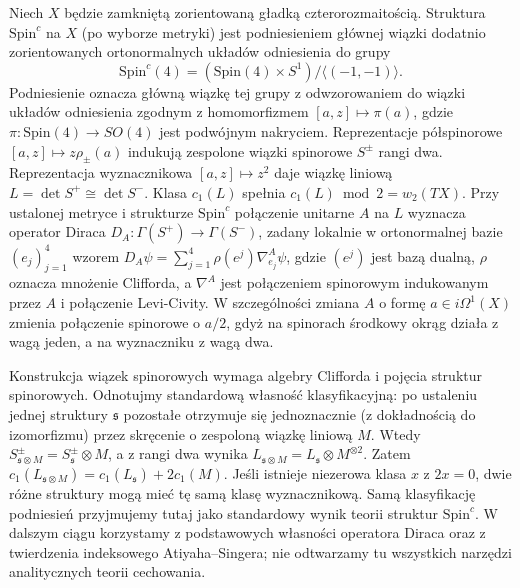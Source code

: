 \begin{definicja}
Niech $X$ będzie zamkniętą zorientowaną gładką
czterorozmaitością. Struktura $\mathrm{Spin}^c$ na $X$
(po wyborze metryki) jest podniesieniem głównej wiązki
dodatnio zorientowanych ortonormalnych układów
odniesienia do grupy
\[
\mathrm{Spin}^c(4)=
(\mathrm{Spin}(4)\times S^1)/\langle(-1,-1)\rangle.
\]
Podniesienie oznacza główną wiązkę tej grupy
z odwzorowaniem do wiązki układów odniesienia
zgodnym z homomorfizmem $[a,z]\mapsto\pi(a)$,
gdzie $\pi:\mathrm{Spin}(4)\to SO(4)$ jest
podwójnym nakryciem. Reprezentacje półspinorowe
$[a,z]\mapsto z\rho_\pm(a)$ indukują zespolone
wiązki spinorowe $S^\pm$ rangi dwa. Reprezentacja
wyznacznikowa $[a,z]\mapsto z^2$ daje wiązkę
liniową $L=\det S^+\cong\det S^-$.
Klasa $c_1(L)$ spełnia $c_1(L)\bmod2=w_2(TX)$.
Przy ustalonej metryce i strukturze $\mathrm{Spin}^c$
połączenie unitarne $A$ na $L$ wyznacza operator Diraca
$D_A:\Gamma(S^+)\to\Gamma(S^-)$, zadany lokalnie
w ortonormalnej bazie $(e_j)_{j=1}^4$ wzorem
$D_A\psi=\sum_{j=1}^4\rho(e^j)\nabla^A_{e_j}\psi$,
gdzie $(e^j)$ jest bazą dualną, $\rho$ oznacza
mnożenie Clifforda, a $\nabla^A$ jest połączeniem
spinorowym indukowanym przez $A$ i połączenie
Levi-Civity.
W szczególności zmiana $A$ o formę
$a\in i\Omega^1(X)$ zmienia połączenie spinorowe
o $a/2$, gdyż na spinorach środkowy okrąg
działa z wagą jeden, a na wyznaczniku z wagą dwa.
\end{definicja}

\begin{uwaga}
Konstrukcja wiązek spinorowych wymaga algebry Clifforda
i pojęcia struktur spinorowych. Odnotujmy standardową
własność klasyfikacyjną: po ustaleniu jednej struktury
$\mathfrak s$ pozostałe otrzymuje się jednoznacznie
(z dokładnością do izomorfizmu) przez skręcenie
o zespoloną wiązkę liniową $M$. Wtedy
$S^\pm_{\mathfrak s\otimes M}=S^\pm_{\mathfrak s}\otimes M$,
a z rangi dwa wynika
$L_{\mathfrak s\otimes M}=L_{\mathfrak s}\otimes M^{\otimes2}$.
Zatem $c_1(L_{\mathfrak s\otimes M})=c_1(L_{\mathfrak s})+2c_1(M)$.
Jeśli istnieje niezerowa klasa $x$ z $2x=0$,
dwie różne struktury mogą mieć tę samą klasę
wyznacznikową. Samą klasyfikację podniesień
przyjmujemy tutaj jako standardowy wynik teorii
struktur $\mathrm{Spin}^c$.
W dalszym ciągu korzystamy z podstawowych własności
operatora Diraca oraz z twierdzenia indeksowego
Atiyaha--Singera; nie odtwarzamy tu wszystkich narzędzi
analitycznych teorii cechowania.
\end{uwaga}

